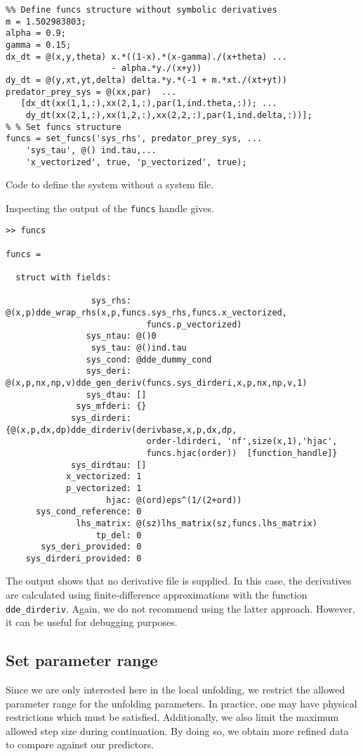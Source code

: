 \begin{listing}[!ht]
\begin{verbatim}
%% Define funcs structure without symbolic derivatives
m = 1.502983803;
alpha = 0.9;
gamma = 0.15;
dx_dt = @(x,y,theta) x.*((1-x).*(x-gamma)./(x+theta) ...
                     - alpha.*y./(x+y))
dy_dt = @(y,xt,yt,delta) delta.*y.*(-1 + m.*xt./(xt+yt))
predator_prey_sys = @(xx,par)  ...
   [dx_dt(xx(1,1,:),xx(2,1,:),par(1,ind.theta,:)); ...
    dy_dt(xx(2,1,:),xx(1,2,:),xx(2,2,:),par(1,ind.delta,:))];
% % Set funcs structure
funcs = set_funcs('sys_rhs', predator_prey_sys, ...
    'sys_tau', @() ind.tau,...
    'x_vectorized', true, 'p_vectorized', true);
\end{verbatim}
\caption{Code to define the system without a system file.}
\label{sm:lst:wo_system_file}
\end{listing}
Inspecting the output of the \texttt{funcs} handle gives.
\begin{verbatim}
>> funcs

funcs =

  struct with fields:

                 sys_rhs: @(x,p)dde_wrap_rhs(x,p,funcs.sys_rhs,funcs.x_vectorized,
                            funcs.p_vectorized)
                sys_ntau: @()0
                 sys_tau: @()ind.tau
                sys_cond: @dde_dummy_cond
                sys_deri: @(x,p,nx,np,v)dde_gen_deriv(funcs.sys_dirderi,x,p,nx,np,v,1)
                sys_dtau: []
              sys_mfderi: {}
             sys_dirderi: {@(x,p,dx,dp)dde_dirderiv(derivbase,x,p,dx,dp,
                            order-ldirderi, 'nf',size(x,1),'hjac',
                            funcs.hjac(order))  [function_handle]}
             sys_dirdtau: []
            x_vectorized: 1
            p_vectorized: 1
                    hjac: @(ord)eps^(1/(2+ord))
      sys_cond_reference: 0
              lhs_matrix: @(sz)lhs_matrix(sz,funcs.lhs_matrix)
                  tp_del: 0
       sys_deri_provided: 0
    sys_dirderi_provided: 0
\end{verbatim}
The output shows that no derivative file is supplied. In this case, the
derivatives are calculated using finite-difference approximations with the
function \texttt{dde_dirderiv}. Again, we do not recommend using the latter
approach. However, it can be useful for debugging purposes.

\subsection{Set parameter range}
Since we are only interested here in the local unfolding, we restrict the
allowed parameter range for the unfolding parameters. In practice, one may have
physical restrictions which must be satisfied. Additionally, we also limit the
maximum allowed step size during continuation. By doing so, we obtain more refined
data to compare against our predictors.
\inputminted[firstline=37, lastline=40]{MATLAB}{\pathToDDEBifToolDemos/predator_prey/predator_prey.m}

